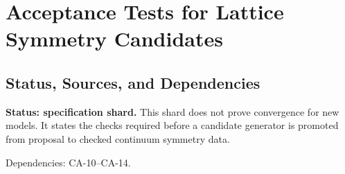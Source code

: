 
\section{Acceptance Tests for Lattice Symmetry Candidates}
\label{sec:lattice-symmetry-acceptance-tests}

\subsection{Status, Sources, and Dependencies}

\textbf{Status: specification shard.}  This shard does not prove convergence for
new models.  It states the checks required before a candidate generator is
promoted from proposal to checked continuum symmetry data.

Dependencies: CA-10--CA-14.


